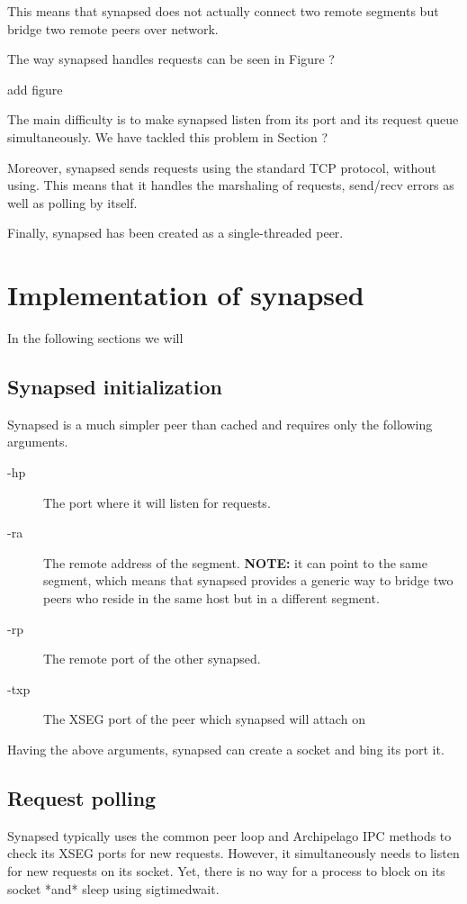 This means that synapsed does not actually connect two remote segments
but bridge two remote peers over network.

The way synapsed handles requests can be seen in Figure ?

\fixme add figure

The main difficulty is to make synapsed listen from its port and its request 
queue simultaneously. We have tackled this problem in Section ?

Moreover, synapsed sends requests using the standard TCP protocol, without 
using.  This means that it handles the marshaling of requests, send/recv errors 
as well as polling by itself.

Finally, synapsed has been created as a single-threaded peer.

\section{Implementation of synapsed}

In the following sections we will

\subsection{Synapsed initialization}

Synapsed is a much simpler peer than cached and requires only the following 
arguments.

\begin{description}
	\item[-hp] The port where it will listen for requests.
	\item[-ra] The remote address of the segment. \textbf{NOTE:} it can 
		point to the same segment, which means that synapsed provides a 
		generic way to bridge two peers who reside in the same host but 
		in a different segment.
	\item[-rp] The remote port of the other synapsed.
	\item[-txp] The XSEG port of the peer which synapsed will attach on
\end{description}

Having the above arguments, synapsed can create a socket and bing its port it.  

\subsection{Request polling}

Synapsed typically uses the common peer loop and Archipelago IPC methods to 
check its XSEG ports for new requests. However, it simultaneously needs to 
listen for new requests on its socket. Yet, there is no way for a process to 
block on its socket *and* sleep using sigtimedwait.


